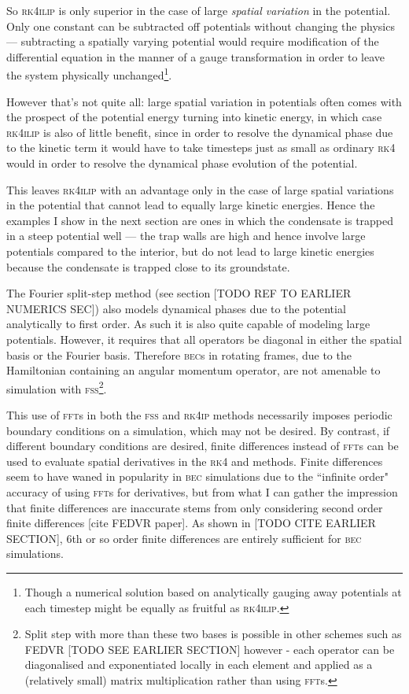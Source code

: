 So \textsc{rk4ilip} is only superior in the case of large \emph{spatial variation} in the potential. Only one constant can be subtracted off potentials without changing the physics --- subtracting a spatially varying potential would require modification of the differential equation in the manner of a gauge transformation in order to leave the system physically unchanged\footnote{Though a numerical solution based on analytically gauging away potentials at each timestep might be equally as fruitful as \textsc{rk4ilip}.}.

However that's not quite all: large spatial variation in potentials often comes with the prospect of the potential energy turning into kinetic energy, in which case \textsc{rk4ilip} is also of little benefit, since in order to resolve the dynamical phase due to the kinetic term it would have to take timesteps just as small  as ordinary \textsc{rk4} would in order to resolve the dynamical phase evolution of the potential.

This leaves \textsc{rk4ilip} with an advantage only in the case of large spatial variations in the potential that cannot lead to equally large kinetic energies. Hence the examples I show in the next section are ones in which the condensate is trapped in a steep potential well --- the trap walls are high and hence involve large potentials compared to the interior, but do not lead to large kinetic energies because the condensate is trapped close to its groundstate.

The Fourier split-step method (see section [TODO REF TO EARLIER NUMERICS SEC]) also models dynamical phases due to the potential analytically to first order. As such it is also quite capable of modeling large potentials. However, it requires that all operators be diagonal in either the spatial basis or the Fourier basis. Therefore \textsc{bec}s in rotating frames, due to the Hamiltonian containing an angular momentum operator, are not amenable to simulation with \textsc{fss}\footnote{Split step with more than these two bases is possible in other schemes such as \textsc{FEDVR} [TODO SEE EARLIER SECTION] however - each operator can be diagonalised and exponentiated locally in each element and applied as a (relatively small) matrix multiplication rather than using \textsc{fft}s.}.

This use of \textsc{fft}s in both the \textsc{fss} and \textsc{rk4ip} methods necessarily imposes periodic boundary conditions on a simulation, which may not be desired. By contrast, if different boundary conditions are desired, finite differences instead of \textsc{fft}s can be used to evaluate spatial derivatives in the \textsc{rk4} and  methods. Finite differences seem to have waned in popularity in \textsc{bec} simulations due to the ``infinite order" accuracy of using \textsc{fft}s for derivatives, but from what I can gather the impression that finite differences are inaccurate stems from only considering second order finite differences [cite FEDVR paper]. As shown in [TODO CITE EARLIER SECTION], 6th or so order finite differences are entirely sufficient for \textsc{bec} simulations.

